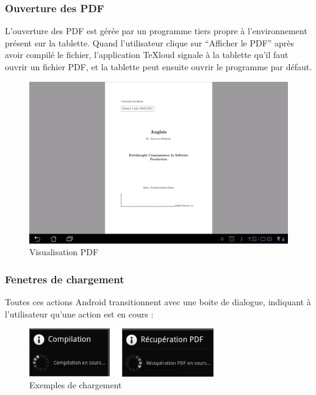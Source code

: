 \documentclass[a4paper,12pt]{article}
\begin{document}
\newpage
\subsubsection{Ouverture des PDF}
L'ouverture des PDF est gérée par un programme tiers propre à l'environnement présent sur la tablette. Quand l'utilisateur clique sur ``Afficher le PDF'' après avoir compilé le fichier, l'application TeXloud signale à la tablette qu'il faut ouvrir un fichier PDF, 
et la tablette peut ensuite ouvrir le programme par défaut.

\begin{figure}[!ht]
\begin{center}
  \includegraphics[width=1\textwidth]{./images/screenshot/visuPdf_Android.png}
\end{center}
  \caption{Visualisation PDF}
  \label{Visualisation PDF}
\end{figure}


\subsubsection{Fenetres de chargement}
Toutes ces actions Android transitionnent avec une boite de dialogue, indiquant à l'utilisateur qu'une action est en cours :

\begin{figure}[!ht]
\begin{center}
  \includegraphics[width=8cm]{./images/screenshot/loading1_Android.png}
\end{center}
  \caption{Exemples de chargement}
  \label{Exemples de chargement}
\end{figure}
\end{document}
